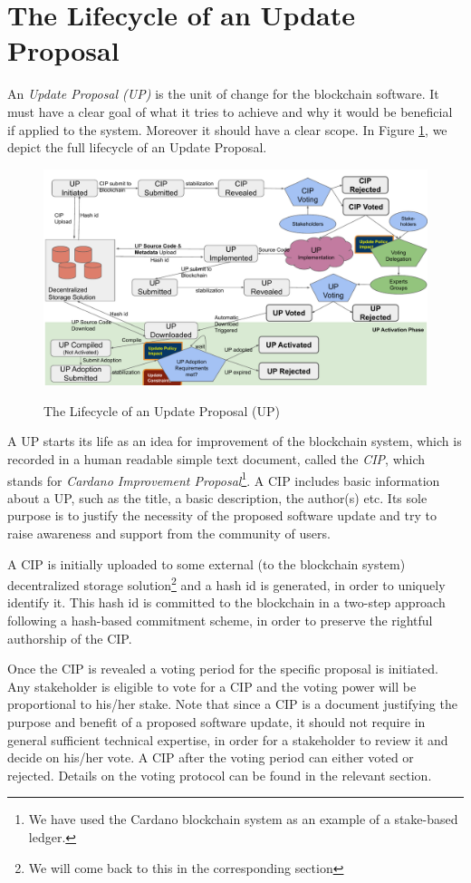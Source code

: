 \section{The Lifecycle of an Update Proposal}
An \emph{Update Proposal (UP)} is the unit of change for the blockchain software. It must have a clear goal of what it tries to achieve and why it would be beneficial if applied to the system. Moreover it should have a clear scope. In Figure \ref{lifecycle}, we depict the full lifecycle of an Update Proposal.

\begin{figure}[H]
    \caption{The Lifecycle of an Update Proposal (UP)}
    \centering
    \includegraphics[width=0.9 \columnwidth,keepaspectratio]{figures/Update_Proposal_Lifecycle.pdf}
    \label{lifecycle}
\end{figure}

A UP starts its life as an idea for improvement of the blockchain system, which is recorded in a human readable simple text document, called the \emph{CIP}, which stands for \emph{Cardano Improvement Proposal}\footnote{We have used the Cardano \citep{cardano} blockchain system as an example of a stake-based ledger.}. A CIP includes basic information about a UP, such as the title, a basic description, the author(s) etc. Its sole purpose is to justify the necessity of the proposed software update and try to raise awareness and support from the community of users.

A CIP is initially uploaded to some external (to the blockchain system) decentralized storage solution\footnote{We will come back to this in the corresponding section} and a hash id is generated, in order to uniquely identify it. This hash id is committed to the blockchain in a two-step approach following a hash-based commitment scheme, in order to preserve the rightful authorship of the CIP.

Once the CIP is revealed a voting period for the specific proposal is initiated. Any stakeholder is eligible to vote for a CIP and the voting power will be proportional to his/her stake. Note that since a CIP is a document justifying the purpose and benefit of a proposed software update, it should not require in general sufficient technical expertise, in order for a stakeholder to review it and decide on his/her vote. A CIP after the voting period can either voted or rejected. Details on the voting protocol can be found in the relevant section.



